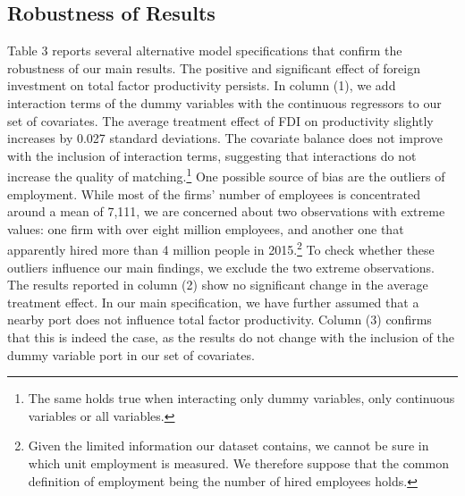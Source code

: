\documentclass[a4paper,11pt]{scrartcl}
\begin{document}
\subsection{Robustness of Results}

Table 3 reports several alternative model specifications that confirm the robustness of our main results. The positive and significant effect of foreign investment on total factor productivity persists. In column (1), we add interaction terms of the dummy variables with the continuous regressors to our set of covariates. The average treatment effect of FDI on productivity slightly increases by 0.027 standard deviations. The covariate balance does not improve with the inclusion of interaction terms, suggesting that interactions do not increase the quality of matching.\footnote{The same holds true when interacting only dummy variables, only continuous variables or all variables.} One possible source of bias are the outliers of employment. While most of the firms' number of employees is concentrated around a mean of 7,111, we are concerned about two observations with extreme values: one firm with over eight million employees, and another one that apparently hired more than 4 million people in 2015.\footnote{Given the limited information our dataset contains, we cannot be sure in which unit employment is measured. We therefore suppose that the common definition of employment being the number of hired employees holds.}  To check whether these outliers influence our main findings, we exclude the two extreme observations. The results reported in column (2) show no significant change in the average treatment effect. %
In our main specification, we have further assumed that a nearby port does not influence total factor productivity. Column (3) confirms that this is indeed the case, as the results do not change with the inclusion of the dummy variable port in our set of covariates. 
\end{document}
